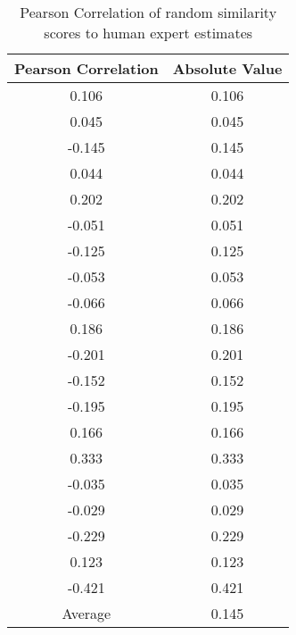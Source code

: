\documentclass{article}
\begin{document}
\begin{table}[h!]
\caption{Pearson Correlation of random similarity scores to human expert estimates}
\centering
\begin{tabular}{|c|c|}
	\hline
	Pearson Correlation & Absolute Value \\
	\hline
	0.106 & 0.106 \\
	0.045 & 0.045 \\
	-0.145 & 0.145 \\
	0.044 & 0.044 \\
	0.202 & 0.202 \\
	-0.051 & 0.051 \\
	-0.125 & 0.125 \\
	-0.053 & 0.053 \\
	-0.066 & 0.066 \\
	0.186 & 0.186 \\
	-0.201 & 0.201 \\
	-0.152 & 0.152 \\
	-0.195 & 0.195 \\
	0.166 & 0.166 \\
	0.333 & 0.333 \\
	-0.035 & 0.035 \\
	-0.029 & 0.029 \\
	-0.229 & 0.229 \\
	0.123 & 0.123 \\
	-0.421 & 0.421 \\
	\hline
	Average & 0.145\\
	\hline
\end{tabular}
\label{table:randomresults}
\end{table}
\end{document}
